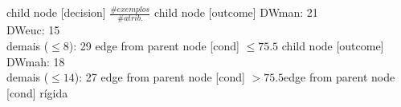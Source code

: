child {node [decision] {$\frac{\#exemplos}{\#atrib.}$}
child {node [outcome] {
DWman: 21\\
DWeuc: 15\\
demais ($\leq 8$): 29} edge from parent node [cond] {$\leq75.5$}}
child {node [outcome] {
DWmah: 18\\
demais ($\leq 14$): 27} edge from parent node [cond] {$>75.5$}}edge from parent node [cond] {rígida}}
